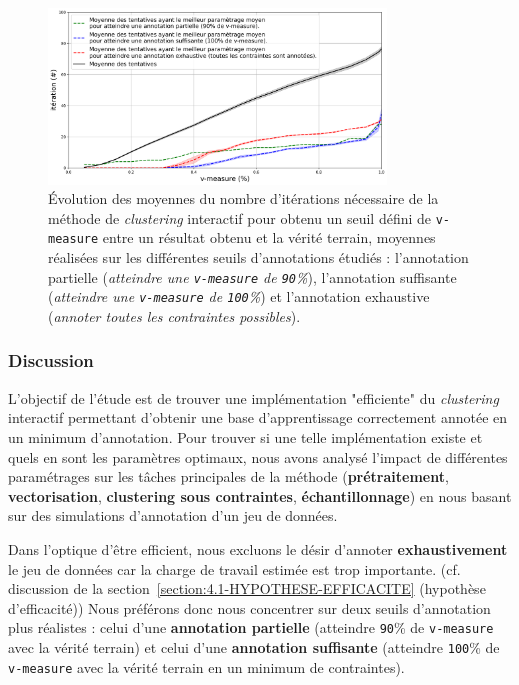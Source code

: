 			\begin{figure}[!htb]
				\centering
				\includegraphics[width=0.8\textwidth]{figures/etude-efficience-evolution-moyenne-5best-par-vmeasure}
				\caption{Évolution des moyennes du nombre d'itérations nécessaire de la méthode de \textit{clustering} interactif pour obtenu un seuil défini de \texttt{v-measure} entre un résultat obtenu et la vérité terrain, moyennes réalisées sur les différentes seuils d'annotations étudiés : l'annotation partielle (\textit{atteindre une \texttt{v-measure} de \texttt{90}\%}), l'annotation suffisante (\textit{atteindre une \texttt{v-measure} de \texttt{100}\%}) et l'annotation exhaustive (\textit{annoter toutes les contraintes possibles}).}
				\label{figure:4.2.1-ETUDE-OPTIMISATION-EVOLUTION-MEILLEUR-PARAMETRAGE}
			\end{figure}

		\subsubsection{Discussion}

			L'objectif de l'étude est de trouver une implémentation "efficiente" du \textit{clustering} interactif permettant d'obtenir une base d'apprentissage correctement annotée en un minimum d'annotation.
			Pour trouver si une telle implémentation existe et quels en sont les paramètres optimaux, nous avons analysé l'impact de différentes paramétrages sur les tâches principales de la méthode (\textbf{prétraitement}, \textbf{vectorisation}, \textbf{clustering sous contraintes}, \textbf{échantillonnage}) en nous basant sur des simulations d'annotation d'un jeu de données.
			
			Dans l'optique d'être efficient, nous excluons le désir d'annoter \textbf{exhaustivement} le jeu de données car la charge de travail estimée est trop importante.
			(cf. discussion de la section~\ref{section:4.1-HYPOTHESE-EFFICACITE} (hypothèse d'efficacité))
			Nous préférons donc nous concentrer sur deux seuils d'annotation plus réalistes : celui d'une \textbf{annotation partielle} (atteindre \texttt{90}\% de \texttt{v-measure} avec la vérité terrain) et celui d'une \textbf{annotation suffisante} (atteindre \texttt{100}\% de \texttt{v-measure} avec la vérité terrain en un minimum de contraintes). 
			
